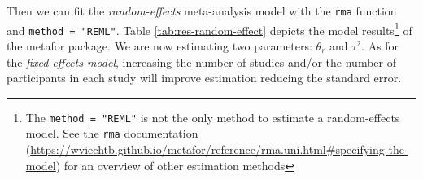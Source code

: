\documentclass[
  man,floatsintext]{apa6}
\newenvironment{Shaded}{\begin{snugshade}}{\end{snugshade}}
\newcommand{\AttributeTok}[1]{\textcolor[rgb]{0.77,0.63,0.00}{#1}}
\newcommand{\CommentTok}[1]{\textcolor[rgb]{0.56,0.35,0.01}{\textit{#1}}}
\newcommand{\DecValTok}[1]{\textcolor[rgb]{0.00,0.00,0.81}{#1}}
\newcommand{\FloatTok}[1]{\textcolor[rgb]{0.00,0.00,0.81}{#1}}
\newcommand{\FunctionTok}[1]{\textcolor[rgb]{0.00,0.00,0.00}{#1}}
\newcommand{\NormalTok}[1]{#1}
\newcommand{\OtherTok}[1]{\textcolor[rgb]{0.56,0.35,0.01}{#1}}
\newcommand{\SpecialCharTok}[1]{\textcolor[rgb]{0.00,0.00,0.00}{#1}}
\newcommand{\StringTok}[1]{\textcolor[rgb]{0.31,0.60,0.02}{#1}}
\begin{document}
\begin{Shaded}
\end{Shaded}

\normalsize

Then we can fit the \emph{random-effects} meta-analysis model with the \texttt{rma} function and \texttt{method\ =\ "REML"}. Table \ref{tab:res-random-effect} depicts the model results\footnote{The \texttt{method\ =\ "REML"} is not the only method to estimate a random-effects model. See the \texttt{rma} documentation (\url{https://wviechtb.github.io/metafor/reference/rma.uni.html\#specifying-the-model}) for an overview of other estimation methods} of the metafor package. We are now estimating two parameters: \(\theta_{r}\) and \(\tau^{2}\). As for the \emph{fixed-effects model}, increasing the number of studies and/or the number of participants in each study will improve estimation reducing the standard error.
\end{document}
